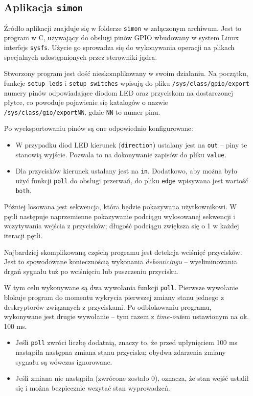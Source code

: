 \documentclass[10pt,a4paper]{article}
\begin{document}
\subsection{Aplikacja \texttt{simon}}

Źródło aplikacji znajduje się w folderze \verb+simon+ w załączonym archiwum. Jest to program w C, używający do obsługi pinów GPIO wbudowany w system Linux interfejs \verb+sysfs+. Użycie go sprowadza się do wykonywania operacji na plikach specjalnych udostępnionych przez sterowniki jądra.

Stworzony program jest dość nieskomplikowany w swoim działaniu. Na początku, funkcje \verb+setup_leds+ i \verb+setup_switches+ wpisują do pliku \verb+/sys/class/gpio/export+ numery pinów odpowiadające diodom LED oraz przyciskom na dostarczonej płytce, co powoduje pojawienie się katalogów o nazwie \verb+/sys/class/gio/exportNN+, gdzie \verb+NN+ to numer pinu.

Po wyeksportowaniu pinów są one odpowiednio konfigurowane:
\begin{itemize}
	\item W przypadku diod LED kierunek (\verb+direction+) ustalany jest na \verb+out+ -- piny te stanowią wyjście. Pozwala to na dokonywanie zapisów do pliku \verb+value+.
	\item Dla przycisków kierunek ustalany jest na \verb+in+. Dodatkowo, aby można było użyć funkcji \verb+poll+ do obsługi przerwań, do pliku \verb+edge+ wpisywana jest wartość \verb+both+.
\end{itemize}

Później losowana jest sekwencja, która będzie pokazywana użytkownikowi. W pętli następuje naprzemienne pokazywanie podciągu wylosowanej sekwencji i wczytywania wejścia z przycisków; długość podciągu zwiększa się o 1 w każdej iteracji pętli.

Najbardziej skomplikowaną częścią programu jest detekcja wciśnięć przycisków. Jest to spowodowane koniecznością wykonania \emph{debouncingu} -- wyeliminowania drgań sygnału tuż po wciśnięciu lub puszczeniu przycisku.

W tym celu wykonywane są dwa wywołania funkcji \verb+poll+. Pierwsze wywołanie blokuje program do momentu wykrycia pierwszej zmiany stanu jednego z deskryptorów związanych z przyciskami. Po odblokowaniu programu, wykonywane jest drugie wywołanie -- tym razem z \emph{time-out}em ustawionym na ok. 100 ms.

\begin{itemize}
	\item Jeśli \verb+poll+ zwróci liczbę dodatnią, znaczy to, że przed upłynięciem 100 ms nastąpiła następna zmiana stanu przycisku; obydwa zdarzenia zmiany sygnału są wówczas ignorowane.
	\item Jeśli zmiana nie nastąpiła (zwrócone zostało 0), oznacza, że stan wejść ustalił się i można bezpiecznie wczytać stan wyprowadzeń.
\end{itemize}
\end{document}
